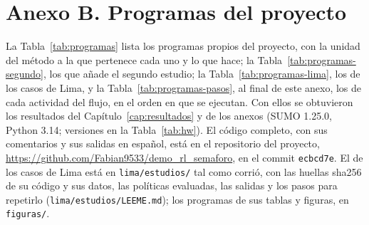 \section*{Anexo B. Programas del proyecto}
{}
\setcounter{table}{0}
\renewcommand{\thetable}{B.\arabic{table}}
\renewcommand{\theHtable}{B.\arabic{table}}

La Tabla~\ref{tab:programas} lista los programas propios del proyecto,
con la unidad del método a la que pertenece cada uno y lo que hace; la
Tabla~\ref{tab:programas-segundo}, los que añade el segundo estudio; la
Tabla~\ref{tab:programas-lima}, los de los casos de Lima, y la
Tabla~\ref{tab:programas-pasos}, al final de este anexo, los de cada
actividad del flujo, en el orden en que se ejecutan. Con ellos se obtuvieron
los resultados del Capítulo~\ref{cap:resultados} y de los anexos (SUMO
1.25.0, Python 3.14; versiones en la Tabla~\ref{tab:hw}). El código
completo, con sus comentarios y sus salidas en español, está en el
repositorio del proyecto,
\url{https://github.com/Fabian9533/demo_rl_semaforo}, en el commit
\texttt{ecbcd7e}. El de los casos de Lima está en \texttt{lima/estudios/} tal como corrió, con las huellas
sha256 de su código y sus datos, las políticas evaluadas, las salidas y
los pasos para repetirlo (\texttt{lima/estudios/LEEME.md}); los programas
de sus tablas y figuras, en \texttt{figuras/}.

